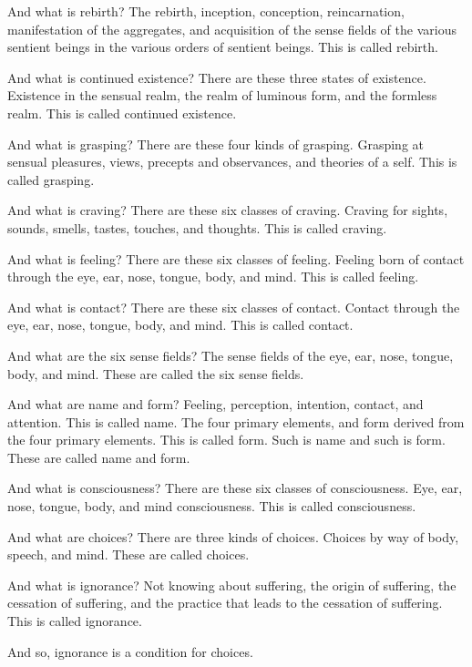 \documentclass[12pt,openany]{book}%
\begin{document}
And what is rebirth? The rebirth, inception, conception, reincarnation, manifestation of the aggregates, and acquisition of the sense fields of the various sentient beings in the various orders of sentient beings. This is called rebirth. 

And what is continued existence? There are these three states of existence. Existence in the sensual realm, the realm of luminous form, and the formless realm. This is called continued existence. 

And what is grasping? There are these four kinds of grasping. Grasping at sensual pleasures, views, precepts and observances, and theories of a self. This is called grasping. 

And what is craving? There are these six classes of craving. Craving for sights, sounds, smells, tastes, touches, and thoughts. This is called craving. 

And what is feeling? There are these six classes of feeling. Feeling born of contact through the eye, ear, nose, tongue, body, and mind. This is called feeling. 

And what is contact? There are these six classes of contact. Contact through the eye, ear, nose, tongue, body, and mind. This is called contact. 

And what are the six sense fields? The sense fields of the eye, ear, nose, tongue, body, and mind. These are called the six sense fields. 

And what are name and form? Feeling, perception, intention, contact, and attention. This is called name. The four primary elements, and form derived from the four primary elements. This is called form. Such is name and such is form. These are called name and form. 

And what is consciousness? There are these six classes of consciousness. Eye, ear, nose, tongue, body, and mind consciousness. This is called consciousness. 

And what are choices? There are three kinds of choices. Choices by way of body, speech, and mind. These are called choices. 

And what is ignorance? Not knowing about suffering, the origin of suffering, the cessation of suffering, and the practice that leads to the cessation of suffering. This is called ignorance. 

And so, ignorance is a condition for choices. 
\end{document}

